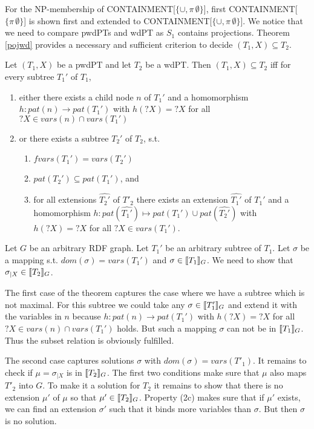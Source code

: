 For the NP-membership of CONTAINMENT[$\{\cup,\pi \, \emptyset\}$], 
first CONTAINMENT[$\{\pi \, \emptyset\}$] is shown first and extended to 
CONTAINMENT[$\{\cup,\pi \, \emptyset\}$]. We notice that we need to compare
pwdPTs and wdPT as $S_1$ contains projections. Theorem \ref{pojwd} provides a
necessary and sufficient criterion to decide $(T_1,X) \subseteq T_2$.

\begin{theorem}\label{projwd}\cite{pichler2014containment}
	Let $(T_1,X)$ be a pwdPT and let $T_2$ be a wdPT. Then $(T_1,X) \subseteq
	T_2$ iff for every subtree $T_1'$ of $T_1$,
	\begin{enumerate}
		\item either there exists a child node $n$ of $T_1'$ and a homomorphism
			$h:pat(n) \rightarrow pat(T_1')$ with $h(?X) = ?X$ for all $?X \in
			vars(n) \cap vars(T_1')$
		\item or there exists a subtree $T_2'$ of $T_2$, s.t.
			\begin{enumerate}
				\item $fvars(T_1') = vars(T_2')$
				\item $pat(T_2') \subseteq pat(T_1')$, and
				\item for all extensions $\hat{T_2'}$ of $T'_2$ there exists an
					extension $\hat{T_1'}$ of $T_1'$ and a homomorphism 
					$h: pat(\hat{T_1'}) \mapsto pat(T_1') \cup pat(\hat{T_2'})$
					with $h(?X) = ?X$ for all $?X \in vars (T_1')$.
			\end{enumerate}
	\end{enumerate}
\end{theorem}
\begin{proofidea}
Let $G$ be an arbitrary RDF graph. Let $T_1'$ be an arbitrary subtree
of $T_1$. Let $\sigma$ be a mapping s.t. $dom(\sigma) = vars(T_1')$ and $\sigma
\in \llbracket T_1 \rrbracket_G$. We need to show that $\sigma_{|X} \in \llbracket T_2 \rrbracket_G$.

The first case of the theorem captures the case where we have a subtree which is
not maximal. For this subtree we could take any $\sigma
\in \llbracket T_1' \rrbracket_G$ and extend it with the variables in $n$ because  
$h:pat(n) \rightarrow pat(T_1')$ with $h(?X) = ?X$ for all $?X \in
vars(n) \cap vars(T_1')$ holds. But such a mapping $\sigma$ can not be in $\llbracket
T_1 \rrbracket_G$. Thus the subset relation is obviously fulfilled.

The second case captures solutions $\sigma$ with $dom(\sigma) = vars(T'_1)$.
It remains to check if $\mu = \sigma_{|X}$ is in $\llbracket T_2\rrbracket_G$.
The first two conditions make sure that $\mu$ also maps $T'_2$ into $G$. To make
it a solution for $T_2$ it remains to show that there is no extension $\mu'$ of $\mu$
so that $\mu' \in \llbracket T_2\rrbracket_G$. Property (2c) makes sure that if $\mu'$ exists,
we can find an extension $\sigma'$ such that it binds more variables than
$\sigma$. But then $\sigma$ is no solution.
\end{proofidea}


